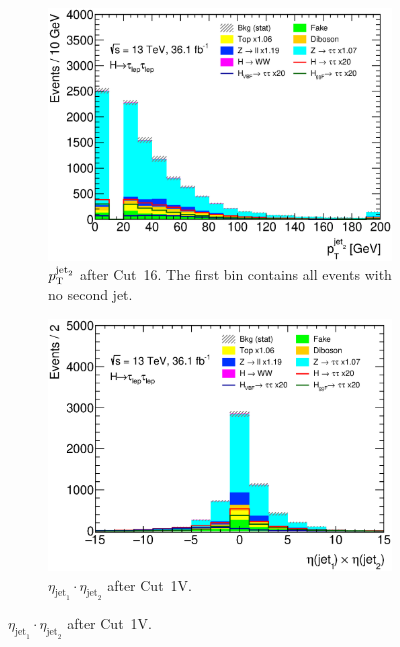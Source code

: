 \begin{figure}[htb]
    \centering
    \begin{subfigure}[t]{0.45\textwidth}
        \includegraphics[width=\textwidth]{./plots/event_selection/categories/ll-CutbVeto-JetPt1-lin.eps}
        \caption{$p_\text{T}^{\text{jet}_2}$ after Cut~16. The first bin contains all events with no second jet.}\label{fig:event_selection:cutflow:vbf:jet2}
    \end{subfigure}
    \begin{subfigure}[t]{0.45\textwidth}
        \includegraphics[width=\textwidth]{./plots/event_selection/categories/ll-CutVBFCatJet1Pt-EtaProductJ0J1-lin.eps}
        \caption{$\eta_{\text{jet}_1} \cdot \eta_{\text{jet}_2}$ after Cut~1V.}\label{fig:event_selection:cutflow:vbf:hemispheres}

\end{subfigure}
\end{figure}
